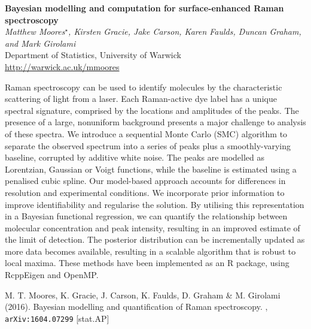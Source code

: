 \documentclass[12pt]{article}
\newcommand{\postertitle}[1]{{\Large\bf #1}\\[12pt]}
\newcommand{\authors}[1]{\emph{#1}\\}
\newcommand{\affiliations}[1]{{#1}\\}
\newcommand{\contacts}[1]{{#1}}
\begin{document}
\begin{center}
\vspace*{0.5cm}
%
\postertitle{Bayesian modelling and computation for surface-enhanced Raman spectroscopy}
%
\authors{Matthew Moores$^\star$, Kirsten Gracie, Jake Carson, Karen Faulds, Duncan Graham, and Mark Girolami} %
% 
\affiliations{Department of Statistics, University of Warwick}
%
\contacts{\url{http://warwick.ac.uk/mmoores}} %
%
\vspace*{0.3cm}
\end{center}

Raman spectroscopy can be used to identify molecules by the characteristic scattering of light from a laser. Each Raman-active dye label has a unique spectral signature, comprised by the locations and amplitudes of the peaks. The presence of a large, nonuniform background presents a major challenge to analysis of these spectra. We introduce a sequential Monte Carlo (SMC) algorithm to separate the observed spectrum into a series of peaks plus a smoothly-varying baseline, corrupted by additive white noise. The peaks are modelled as Lorentzian, Gaussian or Voigt functions, while the baseline is estimated using a penalised cubic spline. Our model-based approach accounts for differences in resolution and experimental conditions. We incorporate prior information to improve identifiability and regularise the solution. By utilising this representation in a Bayesian functional regression, we can quantify the relationship between molecular concentration and peak intensity, resulting in an improved estimate of the limit of detection. The posterior distribution can be incrementally updated as more data becomes available, resulting in a scalable algorithm that is robust to local maxima. These methods have been implemented as an R package, using RcppEigen and OpenMP.

\begin{thebibliography}{1}	
	M. T. Moores, K. Gracie, J. Carson, K. Faulds, D. Graham \& M. Girolami (2016).
	\newblock Bayesian modelling and quantification of Raman spectroscopy.
	, \texttt{arXiv:1604.07299} [stat.AP]
\end{thebibliography}
\end{document}
